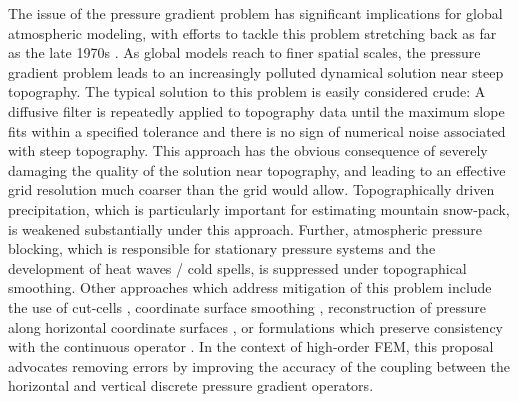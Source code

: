 \documentclass[11pt]{article}
\begin{document}
The issue of the pressure gradient problem has significant implications for global atmospheric modeling, with efforts to tackle this problem stretching back as far as the late 1970s \citep{ZIJ1977BzPdA, DTMZIJ1986MAP}.  As global models reach to finer spatial scales, the pressure gradient problem leads to an increasingly polluted dynamical solution near steep topography.  The typical solution to this problem is easily considered crude:  A diffusive filter is repeatedly applied to topography data until the maximum slope fits within a specified tolerance and there is no sign of numerical noise associated with steep topography.  This approach has the obvious consequence of severely damaging the quality of the solution near topography, and leading to an effective grid resolution much coarser than the grid would allow.  Topographically driven precipitation, which is particularly important for estimating mountain snow-pack, is weakened substantially under this approach.  Further, atmospheric pressure blocking, which is responsible for stationary pressure systems and the development of heat waves / cold spells, is suppressed under topographical smoothing.  Other approaches which address mitigation of this problem include the use of cut-cells \citep{JSSHPAD2013GMDD}, coordinate surface smoothing \citep{JBK2011MWR}, reconstruction of pressure along horizontal coordinate surfaces \cite{GZ2012MWR}, or formulations which preserve consistency with the continuous operator \citep{SJL1997QJRMS}.  In the context of high-order FEM, this proposal advocates removing errors by improving the accuracy of the coupling between the horizontal and vertical discrete pressure gradient operators.


\end{document}
